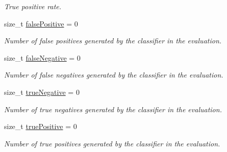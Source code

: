 \begin{DoxyCompactItemize}
\begin{DoxyCompactList}\small\item\em True positive rate. \end{DoxyCompactList}\item 
size\+\_\+t \hyperlink{class_validation_solution_a936e73dc0d14121304e7031593bd842f}{false\+Positive} = 0\hypertarget{class_validation_solution_a936e73dc0d14121304e7031593bd842f}{}\label{class_validation_solution_a936e73dc0d14121304e7031593bd842f}

\begin{DoxyCompactList}\small\item\em Number of false positives generated by the classifier in the evaluation. \end{DoxyCompactList}\item 
size\+\_\+t \hyperlink{class_validation_solution_a654bec4c5a19b8474e784f0bf609c5b8}{false\+Negative} = 0\hypertarget{class_validation_solution_a654bec4c5a19b8474e784f0bf609c5b8}{}\label{class_validation_solution_a654bec4c5a19b8474e784f0bf609c5b8}

\begin{DoxyCompactList}\small\item\em Number of false negatives generated by the classifier in the evaluation. \end{DoxyCompactList}\item 
size\+\_\+t \hyperlink{class_validation_solution_aa074673534cfc23d82a06e82576f836f}{true\+Negative} = 0\hypertarget{class_validation_solution_aa074673534cfc23d82a06e82576f836f}{}\label{class_validation_solution_aa074673534cfc23d82a06e82576f836f}

\begin{DoxyCompactList}\small\item\em Number of true negatives generated by the classifier in the evaluation. \end{DoxyCompactList}\item 
size\+\_\+t \hyperlink{class_validation_solution_a84e59f55bf7e2b296eb21977828d9f07}{true\+Positive} = 0\hypertarget{class_validation_solution_a84e59f55bf7e2b296eb21977828d9f07}{}\label{class_validation_solution_a84e59f55bf7e2b296eb21977828d9f07}

\begin{DoxyCompactList}\small\item\em Number of true positives generated by the classifier in the evaluation. \end{DoxyCompactList}\end{DoxyCompactItemize}
